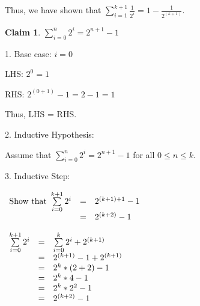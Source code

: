 \documentclass{article}
\newtheorem{claim}{Claim}
\begin{document}
      Thus, we have shown that $\sum\limits_{i=1}^{k+1} \frac{1}{2^i} = 1 - \frac{1}{2^{(k+1)}}$.


    \begin{claim}
      $\sum\limits_{i=0}^{n} 2^i = 2^{n+1} - 1$
    \end{claim}


      \vspace{1mm}
      1. Base case: $i = 0$

      LHS: $2^0 = 1$

      RHS: $2^{(0+1)} - 1 = 2 - 1 = 1$

      Thus, LHS = RHS.

      \vspace{5mm}
      2. Inductive Hypothesis: 

      Assume that $\sum\limits_{i=0}^{n} 2^i = 2^{n+1} - 1$ for all $0 \leqslant n \leqslant k$.

      \vspace{5mm}
      3. Inductive Step: 

      \begin{math}
        \begin{array}{r c l}
          \textnormal{Show that } \sum\limits_{i=0}^{k+1} 2^i & = & 2^{(k+1)+1} - 1 \\
                                                              & = & 2^{(k+2)} - 1 \\
        \end{array}
      \end{math}

      \begin{math}
        \begin{array}{r c l}
          \sum\limits_{i=0}^{k+1} 2^i & = & \sum\limits_{i=0}^{k} 2^i + 2^{(k+1)}\\
                                      & = & 2^{(k+1)} - 1 + 2^{(k+1)}\\
                                      & = & 2^k * (2+2) - 1\\
                                      & = & 2^k * 4 - 1\\
                                      & = & 2^k * 2^2 - 1\\
                                      & = & 2^{(k+2)} - 1\\
        \end{array}
      \end{math}
\end{document}
